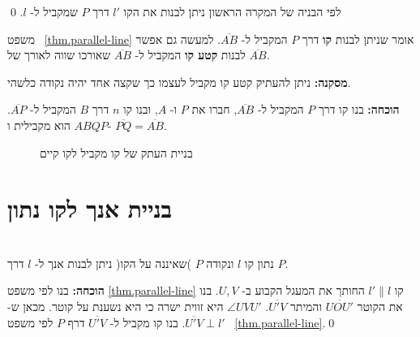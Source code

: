 לפי הבניה של המקרה הראשון ניתן לבנות את הקו
$l'$
דרך 
$P$
שמקביל ל-%
$l$.
\qed

משפט~%
\ref{thm.parallel-line}
אומר שניתן לבנות 
\textbf{קו}
דרך 
$P$
המקביל ל-%
$\overline{AB}$.
למעשה גם אפשר לבנות
\textbf{קטע קו}
המקביל ל-%
$\overline{AB}$
שאורכו שווה לאורך של
$\overline{AB}$.

\textbf{מסקנה:}
ניתן להעתיק קטע קו מקביל לעצמו כך שקצה אחד יהיה נקודה כלשהי.

\textbf{הוכחה:}
בנו קו דרך
$P$
המקביל ל-%
$\overline{AB}$,
חברו את
$P$
ו-%
$A$,
ובנו קו
$n$
דרך 
$B$
המקביל ל-%
$\overline{AP}$.
$ABQP$
הוא מקבילית ו-%
$\overline{PQ}=\overline{AB}$.

\begin{figure}[htb]
\begin{center}
\caption{בניית העתק של קו מקביל לקו קיים}\label{}
\end{center}
\end{figure}


\section{בניית אנך לקו נתון}\label{s.perpendicular}

\begin{theorem}\label{thm.perpendicular}\mbox{}\\
נתון קו
$l$
ונקודה
$P$
)שאיננה על הקו( ניתן לבנות אנך ל-%
$l$
דרך
$P$.%
\end{theorem}

\textbf{הוכחה:}
בנו לפי משפט
\ref{thm.parallel-line}
קו
$l'\|l$
החותך את המעגל הקבוע ב-%
$U,V$.
בנו את הקוטר
$\overline{UOU'}$
והמיתר
$\overline{U'V}$.
$\angle UVU'$
היא זווית ישרה כי היא נשענת על קוטר. מכאן ש-%
$\overline{U'V}\perp l'$.
בנו קו מקביל ל-%
$\overline{U'V}$
דרף
$P$
לפי משפט~%
\ref{thm.parallel-line}.\qed

